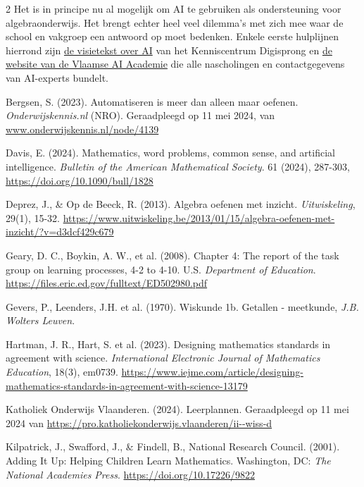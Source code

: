 \begin{multicols} {2}
    Het is in principe nu al mogelijk om AI te gebruiken als ondersteuning voor algebraonderwijs.
    Het brengt echter heel veel dilemma's met zich mee waar de school en vakgroep een antwoord op moet bedenken.
    Enkele eerste hulplijnen hierrond zijn \href{https://www.vlaanderen.be/kenniscentrum-digisprong/themas/innovatie/artificiele-intelligentie}{de visietekst over AI} van het Kenniscentrum Digisprong en \href{https://www.vaia.be/nl/opleidingen}{de website van de Vlaamse AI Academie} die alle nascholingen en contactgegevens van AI-experts bundelt.
    
\end{multicols}

\stopcontents[inhoudloep]		%
\vspace{-1cm}
\begin{bronnen}
    \item Bergsen, S. (2023). Automatiseren is meer dan alleen maar oefenen. \textit{Onderwijskennis.nl} (NRO). Geraadpleegd op 11 mei 2024, van \url{www.onderwijskennis.nl/node/4139}
	\item Davis, E. (2024). Mathematics, word problems, common sense, and artificial intelligence. \textit{Bulletin of the American Mathematical Society}. 61 (2024), 287-303, \url{https://doi.org/10.1090/bull/1828}
    \item Deprez, J., \& Op de Beeck, R. (2013). Algebra oefenen met inzicht. \textit{Uitwiskeling}, 29(1), 15-32.  \url{https://www.uitwiskeling.be/2013/01/15/algebra-oefenen-met-inzicht/?v=d3dcf429c679}
    \item Geary, D. C., Boykin, A. W., et al. (2008). Chapter 4: The report of the task group on learning processes, 4-2 to 4-10. U.S. \textit{Department of Education}. \url{https://files.eric.ed.gov/fulltext/ED502980.pdf}
    \item Gevers, P., Leenders, J.H. et al. (1970). Wiskunde 1b. Getallen - meetkunde, \textit{J.B. Wolters Leuven}.
    \item Hartman, J. R., Hart, S. et al. (2023). Designing mathematics standards in agreement with science. \textit{International Electronic Journal of Mathematics Education}, 18(3), em0739.
    \url{https://www.iejme.com/article/designing-mathematics-standards-in-agreement-with-science-13179}
    \item Katholiek Onderwijs Vlaanderen. (2024). Leerplannen. Geraadpleegd op 11 mei 2024 van \url{https://pro.katholiekonderwijs.vlaanderen/ii--wiss-d}
    \item Kilpatrick, J., Swafford, J., \& Findell, B., National Research Council. (2001). Adding It Up: Helping Children Learn Mathematics. Washington, DC: \textit{The National Academies Press}. \url{https://doi.org/10.17226/9822}

\end{bronnen}
